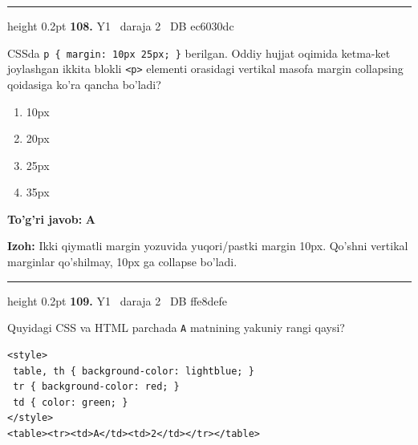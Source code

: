 \documentclass[10pt,a4paper,oneside]{article}
\begin{document}
\vspace{2mm}\hrule height 0.2pt \vspace{4mm}
\hypertarget{q108}{\textbf{\color{ink}108.}}  {\color{muted}\scriptsize Y1 \textbullet\ daraja 2 \textbullet\ DB ec6030dc}
\par
CSSda \texttt{p \{ margin: 10px 25px; \}} berilgan. Oddiy hujjat oqimida ketma-ket joylashgan ikkita blokli \texttt{\textless{}p\textgreater{}} elementi orasidagi vertikal masofa margin collapsing qoidasiga ko'ra qancha bo'ladi?
\begin{enumerate}[label=\Alph*),leftmargin=9mm]
\item 10px
\item 20px
\item 25px
\item 35px
\end{enumerate}
\begin{tcolorbox}[enhanced,breakable,colback=teal!4,colframe=teal!45!black,boxrule=0.45pt,arc=1.2mm,left=2.8mm,right=2.8mm,top=2mm,bottom=2mm,before skip=2mm,after skip=2mm]
\textbf{\color{teal}To'g'ri javob:} \textbf{A}
\par\smallskip
\textbf{Izoh:} Ikki qiymatli margin yozuvida yuqori/pastki margin 10px. Qo'shni vertikal marginlar qo'shilmay, 10px ga collapse bo'ladi.
\end{tcolorbox}
\vspace{2mm}\hrule height 0.2pt \vspace{4mm}
\hypertarget{q109}{\textbf{\color{ink}109.}}  {\color{muted}\scriptsize Y1 \textbullet\ daraja 2 \textbullet\ DB ffe8defe}
\par
Quyidagi CSS va HTML parchada \texttt{A} matnining yakuniy rangi qaysi?

\par
\begin{lstlisting}
<style>
 table, th { background-color: lightblue; }
 tr { background-color: red; }
 td { color: green; }
</style>
<table><tr><td>A</td><td>2</td></tr></table>
\end{lstlisting}
\end{document}
